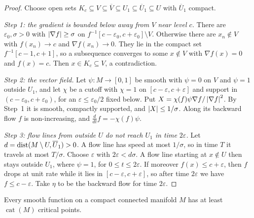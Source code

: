 \begin{proof}
Choose open sets $K_c\subseteq V\subseteq\overline V\subseteq U_1\subseteq\overline U_1\subseteq U$ with
$\overline U_1$ compact.

\emph{Step 1: the gradient is bounded below away from $V$ near level $c$.} There are $\varepsilon_0,\sigma>0$
with $\left\lvert \nabla f \right\rvert\ge\sigma$ on $f^{-1}[c-\varepsilon_0,c+\varepsilon_0]\setminus V$. Otherwise there are
$x_n\notin V$ with $f(x_n)\to c$ and $\nabla f(x_n)\to0$. They lie in the compact set
$f^{-1}[c-1,c+1]$, so a subsequence converges to some $x\notin V$ with $\nabla f(x)=0$ and $f(x)=c$. Then
$x\in K_c\subseteq V$, a contradiction.

\emph{Step 2: the vector field.} Let $\psi\colon M\to[0,1]$ be smooth with $\psi=0$ on $V$ and $\psi=1$
outside $U_1$, and let $\chi$ be a cutoff with $\chi=1$ on $[c-\varepsilon,c+\varepsilon]$ and support in
$(c-\varepsilon_0,c+\varepsilon_0)$, for an $\varepsilon\le\varepsilon_0/2$ fixed below. Put
$X=\chi(f)\psi\nabla f/\left\lvert \nabla f \right\rvert^2$. By Step~1 it is smooth, compactly supported, and
$\left\lvert X \right\rvert\le1/\sigma$. Along its backward flow $f$ is non-increasing, and
$\frac{d}{dt}f=-\chi(f)\psi$.

\emph{Step 3: flow lines from outside $U$ do not reach $U_1$ in time $2\varepsilon$.} Let
$d=\operatorname{dist}(M\setminus U,\overline U_1)>0$. A flow line has speed at most $1/\sigma$, so in time $T$ it travels
at most $T/\sigma$. Choose $\varepsilon$ with $2\varepsilon<d\sigma$. A flow line starting at
$x\notin U$ then stays outside $U_1$, where $\psi=1$, for $0\le t\le2\varepsilon$. If moreover $f(x)\le
c+\varepsilon$, then $f$ drops at unit rate while it lies in $[c-\varepsilon,c+\varepsilon]$, so after time
$2\varepsilon$ we have $f\le c-\varepsilon$. Take $\eta$ to be the backward flow for time $2\varepsilon$.
\end{proof}

\begin{theorem}\label{TOP:thm:LS}
Every smooth function on a compact connected manifold $M$ has at least $\operatorname{cat}(M)$ critical
points.
\end{theorem}

